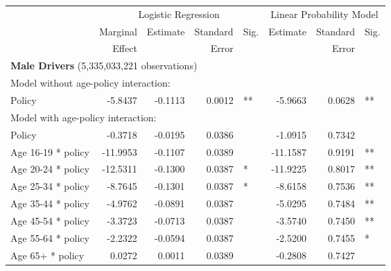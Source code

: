 
\begin{table}%
\centering 
\begin{tabular}{l r r r l r r l} 

\hline 
 
 & \multicolumn{4}{c}{Logistic Regression}  & \multicolumn{3}{c}{Linear Probability Model} \\ 

 \cmidrule(lr){2-5}\cmidrule(lr){6-8} 
 & Marginal & Estimate & Standard & Sig. & Estimate & Standard & Sig. \\ 
 &   Effect &          &  Error   &      &          &  Error   &     \\ 

\hline 
 
\multicolumn{7}{l}{\textbf{Male Drivers} (5,335,033,221 observations)} \\ 

\hline
\multicolumn{7}{l}{Model without age-policy interaction: } \\ 
Policy                   &  -5.8437       &  -0.1113        &  0.0012       &   **       &  -5.9663        &  0.0628       &   **       \\ 
\hline
\multicolumn{7}{l}{Model with age-policy interaction: } \\ 
Policy                   &  -0.3718       &  -0.0195        &  0.0386       &            &  -1.0915        &  0.7342       &            \\ 
Age 16-19 * policy   &  -11.9953       &  -0.1107        &  0.0389       &            &  -11.1587        &  0.9191       &   **       \\ 
Age 20-24 * policy   &  -12.5311       &  -0.1300        &  0.0387       &    *       &  -11.9225        &  0.8017       &   **       \\ 
Age 25-34 * policy   &  -8.7645       &  -0.1301        &  0.0387       &    *       &  -8.6158        &  0.7536       &   **       \\ 
Age 35-44 * policy   &  -4.9762       &  -0.0891        &  0.0387       &            &  -5.0295        &  0.7484       &   **       \\ 
Age 45-54 * policy   &  -3.3723       &  -0.0713        &  0.0387       &            &  -3.5740        &  0.7450       &   **       \\ 
Age 55-64 * policy   &  -2.2322       &  -0.0594        &  0.0387       &            &  -2.5200        &  0.7455       &    *       \\ 
Age 65+ * policy   &  0.0272       &  0.0011        &  0.0389       &            &  -0.2808        &  0.7427       &            \\ 


\end{tabular}
\end{table}
